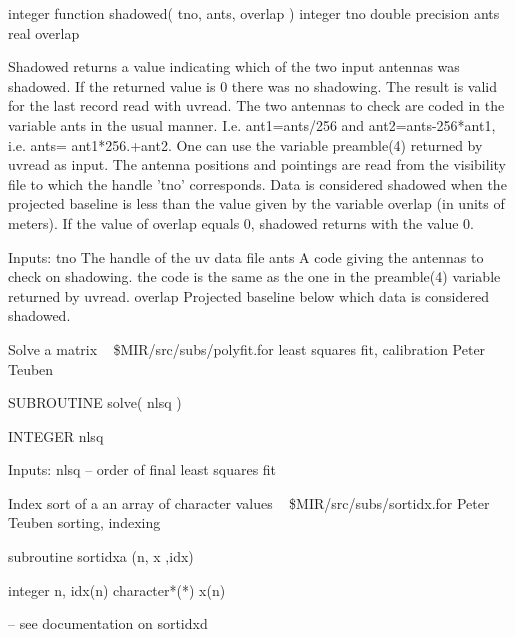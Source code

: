\par{\tenpoint
{\eightpoint\begintt
      integer function shadowed( tno, ants, overlap )
      integer          tno
      double precision ants
      real             overlap

 Shadowed returns a value indicating which of the two input antennas
 was shadowed. If the returned value is 0 there was no shadowing.
 The result is valid for the last record read with uvread.
 The two antennas to check are coded in the variable ants in the
 usual manner. I.e. ant1=ants/256 and ant2=ants-256*ant1, i.e. ants=
 ant1*256.+ant2. One can use the variable preamble(4) returned by
 uvread as input.
 The antenna positions and pointings are read from the visibility
 file to which the handle 'tno' corresponds.
 Data is considered shadowed when the projected baseline is less than
 the value given by the variable overlap (in units of meters).
 If the value of overlap equals 0, shadowed returns with the value 0.

 Inputs:
   tno         The handle of the uv data file
   ants        A code giving the antennas to check on shadowing.
               the code is the same as the one in the preamble(4)
               variable returned by uvread.
   overlap     Projected baseline below which data is considered
               shadowed.
\endtt}
\par}
%
\noindent Solve a matrix
\newline \ 
\newline {} \$MIR/src/subs/polyfit.for
\newline {} least squares fit, calibration
\newline {} Peter Teuben
\par{\tenpoint
{\eightpoint\begintt
        SUBROUTINE solve( nlsq )

        INTEGER nlsq

  Inputs:
       nlsq -- order of final least squares fit
\endtt}
\par}
%
\noindent Index sort of a an array of character values
\newline \ 
\newline {} \$MIR/src/subs/sortidx.for
\newline {} Peter Teuben
\newline \abox{Keywords:} sorting, indexing
\par{\tenpoint
{\eightpoint\begintt
      subroutine sortidxa (n, x ,idx)

      integer n, idx(n)
      character*(*) x(n)

       -- see documentation on sortidxd
\endtt}
\par}
